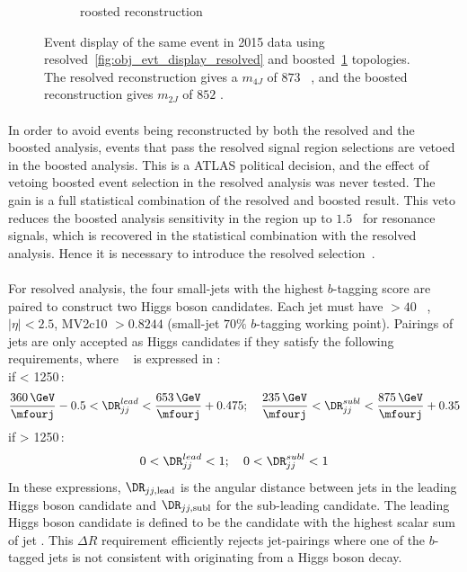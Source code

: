 \begin{figure}[htbp!]
\begin{subfigure}[b]{0.45\textwidth}
        \caption{roosted reconstruction}
        \label{fig:obj_evt_display_boosted}
    \end{subfigure}
\caption{Event display of the same event in 2015 data using resolved~\ref{fig:obj_evt_display_resolved} and  boosted~\ref{fig:obj_evt_display_boosted} topologies. The resolved reconstruction gives a $m_{4J}$ of $873$ \GeV~, and the boosted reconstruction gives $m_{2J}$ of $852$ \GeV. }
\label{fig:obj_evt_display}
\end{figure}

\paragraph{}
In order to avoid events being reconstructed by both the resolved and the boosted analysis, events that pass the resolved signal region selections are vetoed in the boosted analysis.
This is a ATLAS political decision, and the effect of vetoing boosted event selection in the resolved analysis was never tested.
The gain is a full statistical combination of the resolved and boosted result.
This veto reduces the boosted analysis sensitivity in the region up to $1.5$\TeV~ for resonance signals, which is recovered in the statistical combination with the resolved analysis.
Hence it is necessary to introduce the resolved selection~\cite{Aaboud:2018knk}.

\paragraph{}
For resolved analysis, the four small-\R jets with the highest $b$-tagging score are paired to construct two Higgs boson candidates.  
Each jet must have \pt $> 40$ \GeV~, $|\eta| < 2.5$, MV2c10 $> 0.8244$ (small-\R jet $70\%$ $b$-tagging working point). 
Pairings of jets are only accepted as Higgs candidates if they satisfy the following requirements, where \mfourj~ is expressed in \GeV:\\
if \mfourj  < 1250\,\GeV:
\begin{equation}
\frac{360\,\GeV}{\mfourj} - 0.5 < \DR_{jj}^{lead} < \frac{653\,\GeV}{\mfourj} + 0.475;\quad
\frac{235\,\GeV}{\mfourj} < \DR_{jj}^{subl}  < \frac{875\,\GeV}{\mfourj} + 0.35
\end{equation}
\quad if \mfourj  > 1250\,\GeV:
\begin{equation}
0< \DR_{jj}^{lead} < 1;\quad 0 < \DR_{jj}^{subl} < 1
\end{equation}
In these expressions, $\DR_{jj, \mathrm{lead}}$ is the angular distance between jets in the leading Higgs boson candidate and $\DR_{jj, \mathrm{subl}}$ for the sub-leading candidate. 
The leading Higgs boson candidate is defined to be the candidate with the highest scalar sum of jet \pt. 
This $\Delta R$ requirement efficiently rejects jet-pairings where one of the $b$-tagged jets is not consistent with originating from a Higgs boson decay.


